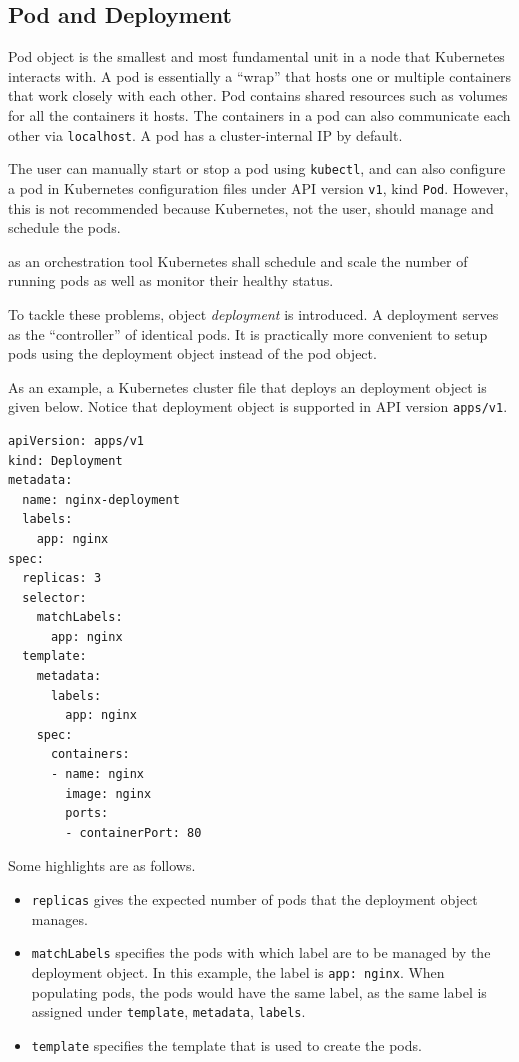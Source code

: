 \subsection{Pod and Deployment}

Pod object is the smallest and most fundamental unit in a node that Kubernetes interacts with. A pod is essentially a ``wrap'' that hosts one or multiple containers that work closely with each other. Pod contains shared resources such as volumes for all the containers it hosts. The containers in a pod can also communicate each other via \verb|localhost|. A pod has a cluster-internal IP by default.

The user can manually start or stop a pod using \verb|kubectl|, and can also configure a pod in Kubernetes configuration files under API version \verb|v1|, kind \verb|Pod|. However, this is not recommended because Kubernetes, not the user, should manage and schedule the pods.

as an orchestration tool Kubernetes shall schedule and scale the number of running pods as well as monitor their healthy status.

To tackle these problems, object \textit{deployment} is introduced. A deployment serves as the ``controller'' of identical pods. It is practically more convenient to setup pods using the deployment object instead of the pod object. 

As an example, a Kubernetes cluster file that deploys an deployment object is given below. Notice that deployment object is supported in API version \verb|apps/v1|.
\begin{lstlisting}
apiVersion: apps/v1
kind: Deployment
metadata:
  name: nginx-deployment
  labels:
    app: nginx
spec:
  replicas: 3
  selector:
    matchLabels:
      app: nginx
  template:
    metadata:
      labels:
        app: nginx
    spec:
      containers:
      - name: nginx
        image: nginx
        ports:
        - containerPort: 80

\end{lstlisting}
Some highlights are as follows.
\begin{itemize}
	\item \verb|replicas| gives the expected number of pods that the deployment object manages.
	\item \verb|matchLabels| specifies the pods with which label are to be managed by the deployment object. In this example, the label is \verb|app: nginx|. When populating pods, the pods would have the same label, as the same label is assigned under \verb|template|, \verb|metadata|, \verb|labels|.
	\item \verb|template| specifies the template that is used to create the pods.
\end{itemize}

